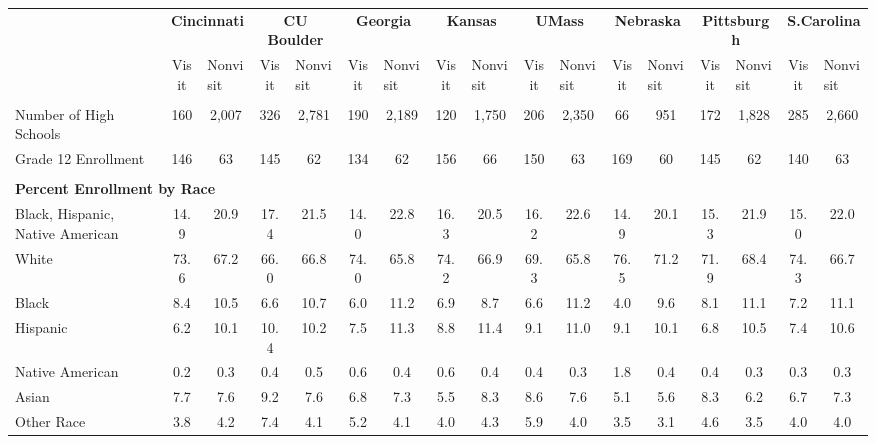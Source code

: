 \begin{tabular*}{\linewidth}{@{\extracolsep{\fill} } lcccccccccccccccc}%
&\multicolumn{2}{c}{\bfseries Cincinnati}&\multicolumn{2}{c}{\bfseries CU Boulder}&\multicolumn{2}{c}{\bfseries Georgia}&\multicolumn{2}{c}{\bfseries Kansas}&\multicolumn{2}{c}{\bfseries UMass}&\multicolumn{2}{c}{\bfseries Nebraska}&\multicolumn{2}{c}{\bfseries Pittsburgh}&\multicolumn{2}{c}{\bfseries S.Carolina}\\%
&Visit&\multicolumn{1}{l}{Nonvisit}&Visit&\multicolumn{1}{l}{Nonvisit}&Visit&\multicolumn{1}{l}{Nonvisit}&Visit&\multicolumn{1}{l}{Nonvisit}&Visit&\multicolumn{1}{l}{Nonvisit}&Visit&\multicolumn{1}{l}{Nonvisit}&Visit&\multicolumn{1}{l}{Nonvisit}&Visit&\multicolumn{1}{l}{Nonvisit}\\%
\hline%
&&&&&&&&&&&&&&&&\\%
\hspace{0cm}Number of High Schools&160&2,007&326&2,781&190&2,189&120&1,750&206&2,350&66&951&172&1,828&285&2,660\\%
\hspace{0cm}Grade 12 Enrollment&146&63&145&62&134&62&156&66&150&63&169&60&145&62&140&63\\%
&&&&&&&&&&&&&&&&\\%
\multicolumn{17}{l}{\bfseries Percent Enrollment by Race}\\%
\hspace{0.2cm}Black, Hispanic, Native American&14.9&20.9&17.4&21.5&14.0&22.8&16.3&20.5&16.2&22.6&14.9&20.1&15.3&21.9&15.0&22.0\\%
\hspace{0.2cm}White&73.6&67.2&66.0&66.8&74.0&65.8&74.2&66.9&69.3&65.8&76.5&71.2&71.9&68.4&74.3&66.7\\%
\hspace{0.2cm}Black&8.4&10.5&6.6&10.7&6.0&11.2&6.9&8.7&6.6&11.2&4.0&9.6&8.1&11.1&7.2&11.1\\%
\hspace{0.2cm}Hispanic&6.2&10.1&10.4&10.2&7.5&11.3&8.8&11.4&9.1&11.0&9.1&10.1&6.8&10.5&7.4&10.6\\%
\hspace{0.2cm}Native American&0.2&0.3&0.4&0.5&0.6&0.4&0.6&0.4&0.4&0.3&1.8&0.4&0.4&0.3&0.3&0.3\\%
\hspace{0.2cm}Asian&7.7&7.6&9.2&7.6&6.8&7.3&5.5&8.3&8.6&7.6&5.1&5.6&8.3&6.2&6.7&7.3\\%
\hspace{0.2cm}Other Race&3.8&4.2&7.4&4.1&5.2&4.1&4.0&4.3&5.9&4.0&3.5&3.1&4.6&3.5&4.0&4.0\\%

\end{tabular*}
